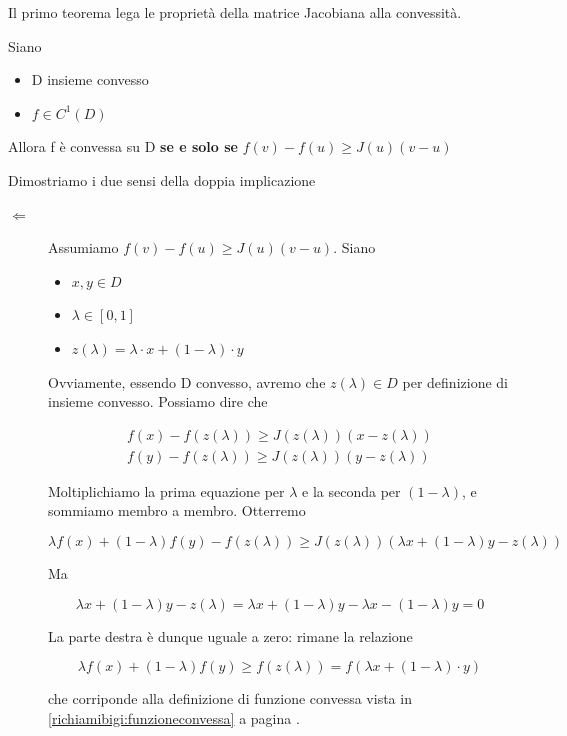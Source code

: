 Il primo teorema lega le proprietà della matrice Jacobiana alla convessità.

\begin{theo}\label{theo:legamejacobconvessita}
Siano
\begin{itemize}
\item D insieme convesso
\item $ f \in C^1(D) $
\end{itemize}
Allora f \`e  convessa su D \textbf{se e solo se} $ f(v) - f(u) \geq J(u)(v-u) $ 
\end{theo}
\begin{thproof}
Dimostriamo i due sensi della doppia implicazione

\begin{description}
\item[$ \Leftarrow $] Assumiamo $ f(v) - f(u) \geq J(u)(v-u) $. Siano
\begin{itemize}
\item $ x,y \in D $
\item $ \lambda \in [0,1] $
\item $ z(\lambda) = \lambda \cdot x + (1-\lambda ) \cdot y $
\end{itemize}

Ovviamente, essendo D convesso, avremo che $ z(\lambda) \in D $ per definizione di insieme convesso.  Possiamo dire che

\begin{eqnarray*}
f(x) - f(z(\lambda)) \geq J(z(\lambda)) (x -z(\lambda)) \\
f(y) - f(z(\lambda)) \geq J(z(\lambda)) (y -z(\lambda))
\end{eqnarray*}

Moltiplichiamo la prima equazione per $ \lambda $ e la seconda per $ (1 - \lambda) $, e sommiamo membro a membro. Otterremo

\[ \lambda f(x) + (1 - \lambda) f(y) - f(z(\lambda)) \geq J(z(\lambda))(\lambda x + (1 - \lambda) y - z(\lambda))  \]

Ma 

\[ \lambda x + (1 - \lambda) y - z(\lambda) = \lambda x + (1 - \lambda) y - \lambda x - (1 - \lambda) y = 0 \]

La parte destra \`e  dunque uguale a zero: rimane la relazione

\[ \lambda f(x) + (1 - \lambda) f(y) \geq f(z(\lambda)) = f(\lambda x + (1-\lambda ) \cdot y) \]

che corriponde alla definizione di funzione convessa vista in \ref{richiamibigi:funzioneconvessa} a pagina \pageref{richiamibigi:funzioneconvessa}.


\end{description}
\end{thproof}
